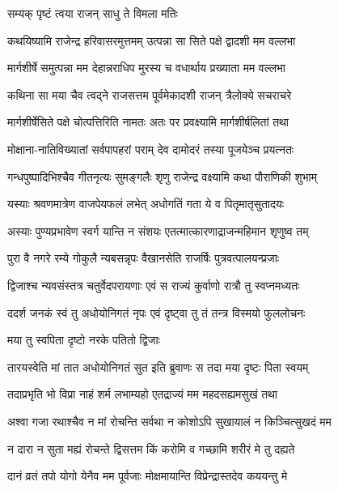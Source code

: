 \onelineshloka
{सम्यक् पृष्टं त्वया राजन् साधु ते विमला मतिः} %

\twolineshloka
{कथयिष्यामि राजेन्द्र हरिवासरमुत्तमम्}
{उत्पन्ना सा सिते पक्षे द्वादशी मम वल्लभा} %

\twolineshloka
{मार्गशीर्षे समुत्पन्ना मम देहान्नराधिप}
{मुरस्य च वधार्थाय प्रख्याता मम वल्लभा} %

\twolineshloka
{कथिना सा मया चैव त्वद्ने राजसत्तम}
{पूर्वमेकादशी राजन् त्रैलोक्ये सचराचरे} %

\twolineshloka
{मार्गशीर्षेसिते पक्षे चोत्पत्तिरिति नामतः}
{अतः पर प्रवक्ष्यामि मार्गशीर्षलितां तथा} %

\twolineshloka
{मोक्षाना-नातिविख्यातां सर्वपापहरां पराम्}
{देव दामोदरं तस्या पूजयेञ्च प्रयत्नतः} %

\twolineshloka
{गन्धपुष्पादिभिश्चैव गीतनृत्यः सुमङ्गलैः}
{शृणु राजेन्द्र वक्ष्यामि कथा पौराणिकी शुभाम्} %

\twolineshloka
{यस्याः श्रवणमात्रेण वाजपेयफलं लभेत्}
{अधोगतिं गता ये व पितृमातृसुतादयः} %

\twolineshloka
{अस्याः पुण्यप्रभावेण स्वर्ग यान्ति न संशयः}
{एतत्मात्कारणाद्राजन्महिमान शृणुष्व तम्} %

\twolineshloka
{पुरा वै नगरे रम्ये गोकुलै न्यबसन्नृपः}
{वैखानसेति राजर्षिः पुत्रवत्पालयन्प्रजाः} %

\twolineshloka
{द्विजाश्च न्यवसंस्तत्र चतुर्वेदपरायणाः}
{एवं स राज्यं कुर्वाणो रात्रौ तु स्वप्नमध्यतः} %

\twolineshloka
{ददर्श जनकं स्वं तु अधोयोनिगतं नृपः}
{एवं दृष्ट्वा तु तं तन्त्र विस्मयो फुललोचनः} %



\onelineshloka
{मया तु स्वपिता दृष्टो नरके पतितो द्विजाः} %

\twolineshloka
{तारयस्वेति मां तात अधोयोनिगतं सुत}
{इति ब्रुवाणः स तदा मया दृष्टः पिता स्वयम्} %

\twolineshloka
{तदाप्रभृति भो विप्रा नाहं शर्म लभाम्यहो}
{एतद्राज्यं मम महदसह्यमसुखं तथा} %

\twolineshloka
{अश्वा गजा रथाश्चैव न मां रोचन्ति सर्वथा}
{न कोशोऽपि सुखायालं न किञ्चित्सुखदं मम} %

\twolineshloka
{न दारा न सुता मह्यं रोचन्ते द्विसत्तम}
{किं करोमि व गच्छामि शरीरं मे तु दह्यते} %

\twolineshloka
{दानं व्रतं तपो योगो येनैव मम पूर्वजाः}
{मोक्षमायान्ति विप्रेन्द्रास्तदेव कययन्तु मे} %

